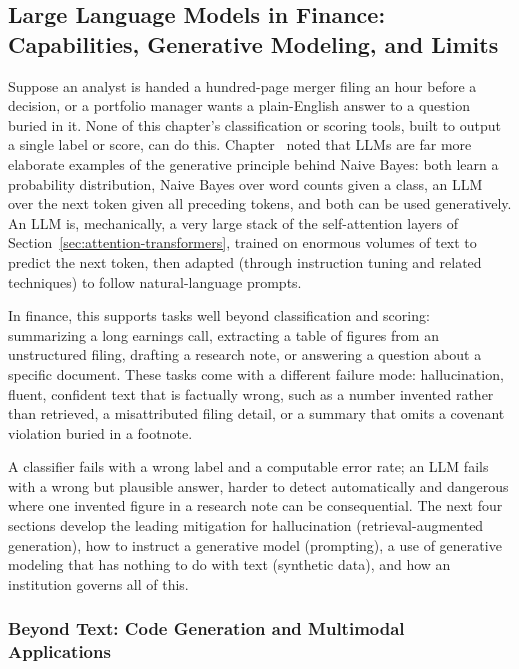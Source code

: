 \documentclass[../ai_in_finance]{subfiles}
\begin{document}
\subsection{Large Language Models in Finance: Capabilities, Generative Modeling, and Limits}
\label{sec:llms-finance}

Suppose an analyst is handed a hundred-page merger filing an hour before a decision, or a portfolio manager wants a plain-English answer to a question buried in it. None of this chapter's classification or scoring tools, built to output a single label or score, can do this. Chapter~ noted that LLMs are far more elaborate examples of the generative principle behind Naive Bayes: both learn a probability distribution, Naive Bayes over word counts given a class, an LLM over the next token given all preceding tokens, and both can be used generatively. An LLM is, mechanically, a very large stack of the self-attention layers of Section~\ref{sec:attention-transformers}, trained on enormous volumes of text to predict the next token, then adapted (through instruction tuning and related techniques) to follow natural-language prompts.

In finance, this supports tasks well beyond classification and scoring: summarizing a long earnings call, extracting a table of figures from an unstructured filing, drafting a research note, or answering a question about a specific document. These tasks come with a different failure mode: hallucination, fluent, confident text that is factually wrong, such as a number invented rather than retrieved, a misattributed filing detail, or a summary that omits a covenant violation buried in a footnote.

A classifier fails with a wrong label and a computable error rate; an LLM fails with a wrong but plausible answer, harder to detect automatically and dangerous where one invented figure in a research note can be consequential. The next four sections develop the leading mitigation for hallucination (retrieval-augmented generation), how to instruct a generative model (prompting), a use of generative modeling that has nothing to do with text (synthetic data), and how an institution governs all of this.

\subsubsection*{Beyond Text: Code Generation and Multimodal Applications}
\end{document}
